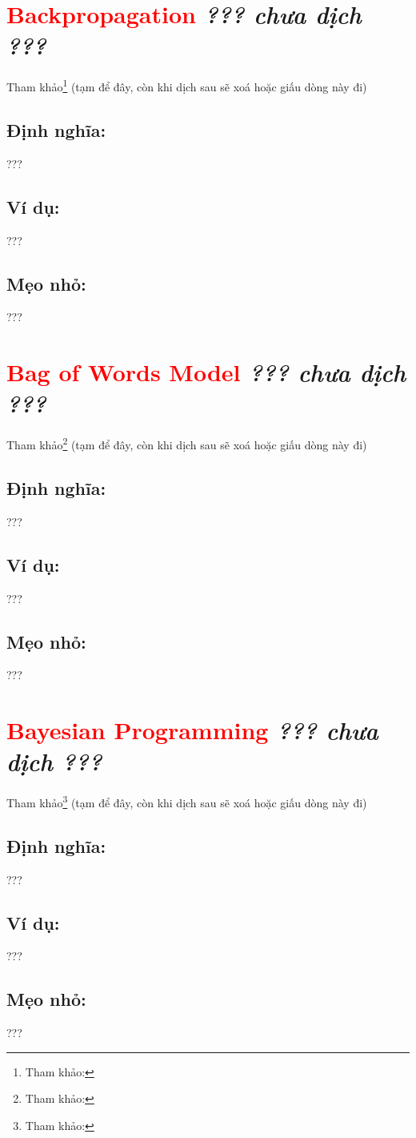 \section*{\huge \textcolor{Red}{Backpropagation}  \small \textit{??? chưa dịch ???} }
Tham khảo\footnote{Tham khảo:} (tạm để đây, còn khi dịch sau sẽ xoá hoặc giấu dòng này đi)
\subsection*{Định nghĩa:}
???
\subsection*{Ví dụ:}
???
\subsection*{Mẹo nhỏ:}
???
\section*{\huge \textcolor{Red}{Bag of Words Model}  \small \textit{??? chưa dịch ???} }
Tham khảo\footnote{Tham khảo:} (tạm để đây, còn khi dịch sau sẽ xoá hoặc giấu dòng này đi)
\subsection*{Định nghĩa:}
???
\subsection*{Ví dụ:}
???
\subsection*{Mẹo nhỏ:}
???
\section*{\huge \textcolor{Red}{Bayesian Programming}  \small \textit{??? chưa dịch ???} }
Tham khảo\footnote{Tham khảo:} (tạm để đây, còn khi dịch sau sẽ xoá hoặc giấu dòng này đi)
\subsection*{Định nghĩa:}
???
\subsection*{Ví dụ:}
???
\subsection*{Mẹo nhỏ:}
???
